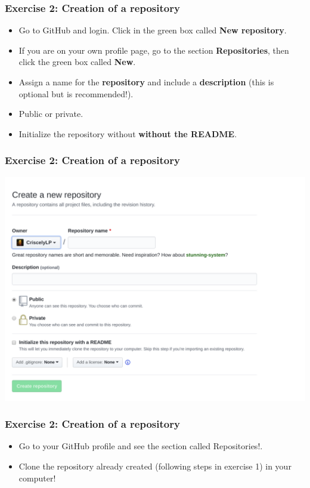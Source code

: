 \documentclass[svgnames]{beamer}
\begin{document}
\begin{frame}[fragile]
\frametitle{Exercise 2: Creation of a repository}

\begin{itemize}
    \item Go to GitHub and login. Click in the green box called \textbf{New repository}. 
    \item If you are on your own profile page, go to the section \textbf{Repositories}, then click the green box called \textbf{New}.
    \item Assign a name for the \textbf{repository} and include a \textbf{description} (this is optional but is recommended!).
    \item Public or private.
    \item Initialize the repository without \textbf{without the README}.
\end{itemize}
\end{frame}

\begin{frame}[fragile]
\frametitle{Exercise 2: Creation of a repository}
\begin{center}
\includegraphics[scale=0.27]{img/github_makeRepo.png}
\end{center}
\end{frame}

\begin{frame}
\frametitle{Exercise 2: Creation of a repository}

\begin{itemize}
     \item Go to your GitHub profile and see the section called Repositories!.
    \item Clone the repository already created (following steps in exercise 1) in your computer!
\end{itemize}
\end{frame}
\end{document}
